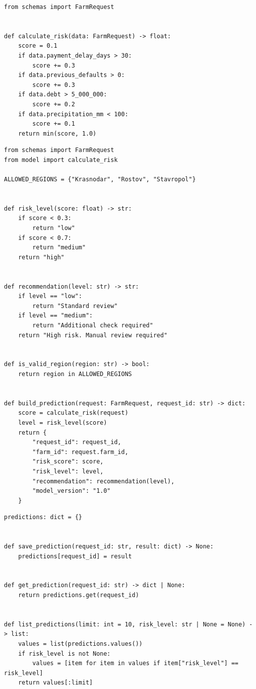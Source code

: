 \documentclass[12pt,a4paper]{article}
\begin{document}
\begin{lstlisting}[caption={model.py}]
from schemas import FarmRequest


def calculate_risk(data: FarmRequest) -> float:
    score = 0.1
    if data.payment_delay_days > 30:
        score += 0.3
    if data.previous_defaults > 0:
        score += 0.3
    if data.debt > 5_000_000:
        score += 0.2
    if data.precipitation_mm < 100:
        score += 0.1
    return min(score, 1.0)
\end{lstlisting}

\begin{lstlisting}[caption={services.py}]
from schemas import FarmRequest
from model import calculate_risk

ALLOWED_REGIONS = {"Krasnodar", "Rostov", "Stavropol"}


def risk_level(score: float) -> str:
    if score < 0.3:
        return "low"
    if score < 0.7:
        return "medium"
    return "high"


def recommendation(level: str) -> str:
    if level == "low":
        return "Standard review"
    if level == "medium":
        return "Additional check required"
    return "High risk. Manual review required"


def is_valid_region(region: str) -> bool:
    return region in ALLOWED_REGIONS


def build_prediction(request: FarmRequest, request_id: str) -> dict:
    score = calculate_risk(request)
    level = risk_level(score)
    return {
        "request_id": request_id,
        "farm_id": request.farm_id,
        "risk_score": score,
        "risk_level": level,
        "recommendation": recommendation(level),
        "model_version": "1.0"
    }
\end{lstlisting}

\begin{lstlisting}[caption={storage.py}]
predictions: dict = {}


def save_prediction(request_id: str, result: dict) -> None:
    predictions[request_id] = result


def get_prediction(request_id: str) -> dict | None:
    return predictions.get(request_id)


def list_predictions(limit: int = 10, risk_level: str | None = None) -> list:
    values = list(predictions.values())
    if risk_level is not None:
        values = [item for item in values if item["risk_level"] == risk_level]
    return values[:limit]
\end{lstlisting}
\end{document}
